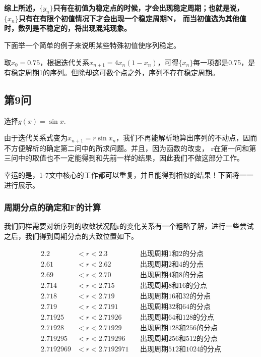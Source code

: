 \documentclass[10pt, a4paper]{article}
\begin{document}
    \textbf{综上所述，$\{y_n\}$只有在初值为稳定点的时候，才会出现稳定周期；也就是说，$\{x_n\}$只有在有限个初值情况下才会出现一个稳定周期N，
    而当初值选为其他值时，数列是不稳定的，将出现混沌现象。}

    下面举一个简单的例子来说明某些特殊初值使序列稳定。

    取$x_0=0.75$，根据迭代关系$x_{n+1}=4x_n(1-x_n)$，可得$\{x_n\}$每一项都是0.75，是有稳定周期1的序列。但除却这可数个点之外，序列不存在稳定周期。


    \subsection{第9问}

    选择$g(x)=\sin x$.

    由于迭代关系式变为$x_{n+1}=r \sin x_n$，我们不再能解析地算出序列的不动点，因而不方便解析的确定第二问中的所求问题。并且，因为函数的改变，
    r在第一问和第三问中的取值也不一定能得到和先前一样的结果，因此我们不做这部分工作。

    幸运的是，1-7文中核心的工作都可以重复，并且能得到相似的结果！下面将一一进行展示。

    \subsubsection{周期分点的确定和F的计算}

    我们同样需要对新序列的收敛状况随r的变化关系有一个粗略了解，进行一些尝试之后，我们得到周期分点的大致位置如下。

    \begin{align*}
        2.2&< r < 2.3 & &\text{出现周期1和2的分点}\\
        2.61&< r < 2.62 & &\text{出现周期2和4的分点}\\
        2.69&< r < 2.70 & &\text{出现周期4和8的分点}\\
        2.714&< r < 2.715 & &\text{出现周期8和16的分点}\\
        2.718&< r < 2.719 & &\text{出现周期16和32的分点}\\
        2.719&< r < 2.7191 & &\text{出现周期32和64的分点}\\
        2.71925&< r < 2.71926 & &\text{出现周期64和128的分点}\\
        2.71928&< r < 2.71929 & &\text{出现周期128和256的分点}\\
        2.719295&< r < 2.719296 & &\text{出现周期256和512的分点}\\
        2.7192969&< r < 2.7192971 & &\text{出现周期512和1024的分点}\\
    \end{align*}
\end{document}

